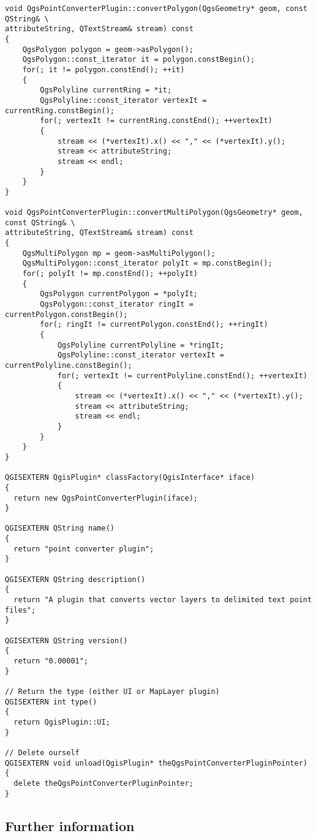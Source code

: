 \begin{verbatim}
void QgsPointConverterPlugin::convertPolygon(QgsGeometry* geom, const QString& \
attributeString, QTextStream& stream) const
{
    QgsPolygon polygon = geom->asPolygon();
    QgsPolygon::const_iterator it = polygon.constBegin();
    for(; it != polygon.constEnd(); ++it)
    {
        QgsPolyline currentRing = *it;
        QgsPolyline::const_iterator vertexIt = currentRing.constBegin();
        for(; vertexIt != currentRing.constEnd(); ++vertexIt)
        {
            stream << (*vertexIt).x() << "," << (*vertexIt).y();
            stream << attributeString;
            stream << endl;
        }
    }
}

void QgsPointConverterPlugin::convertMultiPolygon(QgsGeometry* geom, const QString& \
attributeString, QTextStream& stream) const
{
    QgsMultiPolygon mp = geom->asMultiPolygon();
    QgsMultiPolygon::const_iterator polyIt = mp.constBegin();
    for(; polyIt != mp.constEnd(); ++polyIt)
    {
        QgsPolygon currentPolygon = *polyIt;
        QgsPolygon::const_iterator ringIt = currentPolygon.constBegin();
        for(; ringIt != currentPolygon.constEnd(); ++ringIt)
        {
            QgsPolyline currentPolyline = *ringIt;
            QgsPolyline::const_iterator vertexIt = currentPolyline.constBegin();
            for(; vertexIt != currentPolyline.constEnd(); ++vertexIt)
            {
                stream << (*vertexIt).x() << "," << (*vertexIt).y();
                stream << attributeString;
                stream << endl;
            }
        }
    }
}

QGISEXTERN QgisPlugin* classFactory(QgisInterface* iface)
{
  return new QgsPointConverterPlugin(iface);
}

QGISEXTERN QString name()
{
  return "point converter plugin";
}

QGISEXTERN QString description()
{
  return "A plugin that converts vector layers to delimited text point files";
}

QGISEXTERN QString version()
{
  return "0.00001";
}

// Return the type (either UI or MapLayer plugin)
QGISEXTERN int type()
{
  return QgisPlugin::UI;
}

// Delete ourself
QGISEXTERN void unload(QgisPlugin* theQgsPointConverterPluginPointer)
{
  delete theQgsPointConverterPluginPointer;
}

\end{verbatim}

\subsection{Further information}

